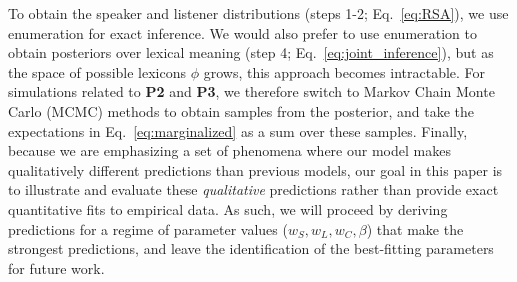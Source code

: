 To obtain the speaker and listener distributions (steps 1-2; Eq.~\ref{eq:RSA}), we use enumeration for exact inference.
We would also prefer to use enumeration to obtain posteriors over lexical meaning (step 4; Eq.~\ref{eq:joint_inference}), but as the space of possible lexicons $\phi$ grows, this approach becomes intractable.
For simulations related to \textbf{P2} and \textbf{P3}, we therefore switch to Markov Chain Monte Carlo (MCMC) methods to obtain samples from the posterior, and take the expectations in Eq.~\ref{eq:marginalized} as a sum over these samples. 
Finally, because we are emphasizing a set of phenomena where our model makes qualitatively different predictions than previous models, our goal in this paper is to illustrate and evaluate these \emph{qualitative} predictions rather than provide exact quantitative fits to empirical data.
As such, we will proceed by deriving predictions for a regime of parameter values ($w_S, w_L, w_C,\beta$) that make the strongest predictions, and leave the identification of the best-fitting parameters for future work. 
